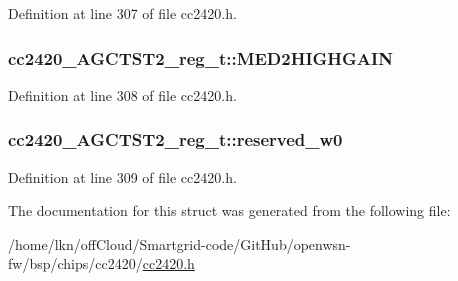Definition at line 307 of file cc2420.\+h.

\subsubsection[{\texorpdfstring{M\+E\+D2\+H\+I\+G\+H\+G\+A\+IN}{MED2HIGHGAIN}}]{ cc2420\+\_\+\+A\+G\+C\+T\+S\+T2\+\_\+reg\+\_\+t\+::\+M\+E\+D2\+H\+I\+G\+H\+G\+A\+IN}\hypertarget{structcc2420___a_g_c_t_s_t2__reg__t_adca6411a9ee9c550c70f6138086dd000}{}\label{structcc2420___a_g_c_t_s_t2__reg__t_adca6411a9ee9c550c70f6138086dd000}


Definition at line 308 of file cc2420.\+h.

\subsubsection[{\texorpdfstring{reserved\+\_\+w0}{reserved_w0}}]{ cc2420\+\_\+\+A\+G\+C\+T\+S\+T2\+\_\+reg\+\_\+t\+::reserved\+\_\+w0}\hypertarget{structcc2420___a_g_c_t_s_t2__reg__t_ada7c03524b1bc1c686001369fcea9b25}{}\label{structcc2420___a_g_c_t_s_t2__reg__t_ada7c03524b1bc1c686001369fcea9b25}


Definition at line 309 of file cc2420.\+h.



The documentation for this struct was generated from the following file\+:\begin{DoxyCompactItemize}
\item 
/home/lkn/off\+Cloud/\+Smartgrid-\/code/\+Git\+Hub/openwsn-\/fw/bsp/chips/cc2420/\hyperlink{cc2420_8h}{cc2420.\+h}\end{DoxyCompactItemize}
